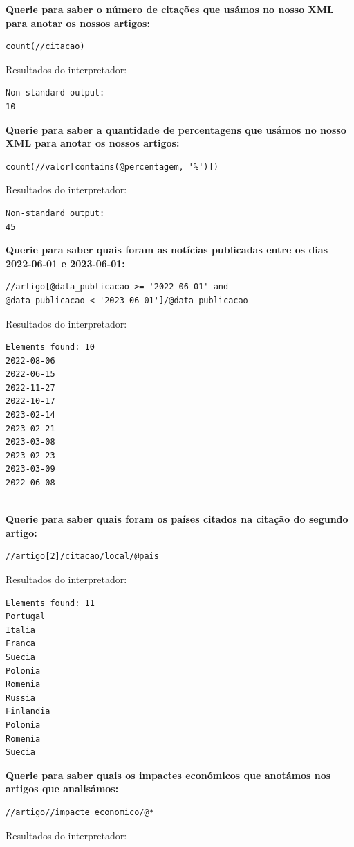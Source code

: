 \documentclass[12pt]{report}
\begin{document}
\textbf{Querie para saber o número de citações que usámos no nosso XML para anotar os nossos artigos:}
\begin{verbatim}
count(//citacao)
\end{verbatim}
Resultados do interpretador:
\begin{lstlisting}
Non-standard output:
10   
\end{lstlisting}
\textbf{Querie para saber a quantidade de percentagens que usámos no nosso XML para anotar os nossos artigos:}
\begin{verbatim}
count(//valor[contains(@percentagem, '%')])
\end{verbatim}
Resultados do interpretador:
\begin{lstlisting}
Non-standard output:
45   
\end{lstlisting}
\textbf{Querie para saber quais foram as notícias publicadas entre os dias 2022-06-01 e 2023-06-01:}
\begin{verbatim}
//artigo[@data_publicacao >= '2022-06-01' and
@data_publicacao < '2023-06-01']/@data_publicacao
\end{verbatim}
Resultados do interpretador:
\begin{lstlisting}
Elements found: 10
2022-08-06
2022-06-15
2022-11-27
2022-10-17
2023-02-14
2023-02-21
2023-03-08
2023-02-23
2023-03-09
2022-06-08
    
\end{lstlisting}
\textbf{Querie para saber quais foram os países citados na citação do segundo artigo:} 
\begin{verbatim}
//artigo[2]/citacao/local/@pais 
\end{verbatim}
Resultados do interpretador:
\begin{lstlisting}
Elements found: 11
Portugal
Italia
Franca
Suecia
Polonia
Romenia
Russia
Finlandia
Polonia
Romenia
Suecia  
\end{lstlisting}
\textbf{Querie para saber quais os impactes económicos que anotámos nos artigos que analisámos:}
\begin{verbatim}
//artigo//impacte_economico/@*   
\end{verbatim}
Resultados do interpretador:
\end{document}
